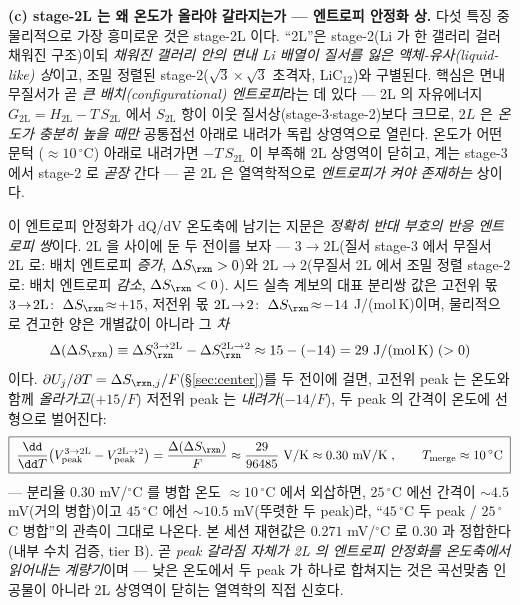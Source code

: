 \textbf{(c) stage-2L 는 왜 온도가 올라야 갈라지는가 --- 엔트로피 안정화 상.} 다섯 특징 중 물리적으로 가장 흥미로운
것은 stage-2L 이다. ``2L''은 stage-2(Li 가 한 갤러리 걸러 채워진 구조)이되 \emph{채워진 갤러리 안의 면내 Li 배열이
질서를 잃은 액체-유사(liquid-like) 상}이고, 조밀 정렬된 stage-2($\sqrt3\!\times\!\sqrt3$ 초격자, $\mathrm{LiC_{12}}$)와
구별된다. 핵심은 면내 무질서가 곧 \emph{큰 배치(configurational) 엔트로피}라는 데 있다 --- 2L 의 자유에너지
$G_{2\mathrm L}=H_{2\mathrm L}-T\,S_{2\mathrm L}$ 에서 $S_{2\mathrm L}$ 항이 이웃 질서상(stage-3$\cdot$stage-2)보다
크므로, $2L$ 은 \emph{온도가 충분히 높을 때만} 공통접선 아래로 내려가 독립 상영역으로 열린다. 온도가 어떤 문턱
($\approx10\,^\circ$C) 아래로 내려가면 $-T\,S_{2\mathrm L}$ 이 부족해 2L 상영역이 닫히고, 계는 stage-3 에서
stage-2 로 \emph{곧장} 간다 --- 곧 2L 은 열역학적으로 \emph{엔트로피가 켜야 존재하는} 상이다.

이 엔트로피 안정화가 dQ/dV 온도축에 남기는 지문은 \emph{정확히 반대 부호의 반응 엔트로피 쌍}이다. 2L 을 사이에 둔
두 전이를 보자 --- $3\!\to\!2\mathrm L$(질서 stage-3 에서 무질서 2L 로: 배치 엔트로피 \emph{증가}, $\Delta S_{\rxn}>0$)와
$2\mathrm L\!\to\!2$(무질서 2L 에서 조밀 정렬 stage-2 로: 배치 엔트로피 \emph{감소}, $\Delta S_{\rxn}<0$). 시드 실측
계보의 대표 분리쌍 값은 고전위 몫 $3\!\to\!2\mathrm L\!:\ \Delta S_{\rxn}\!\approx\!+15$, 저전위 몫
$2\mathrm L\!\to\!2\!:\ \Delta S_{\rxn}\!\approx\!-14$ J/(mol\,K)이며, 물리적으로 견고한 양은 개별값이 아니라 그 \emph{차}
\begin{equation}
\Delta(\Delta S_{\rxn})\equiv\Delta S_{\rxn}^{3\to2\mathrm L}-\Delta S_{\rxn}^{2\mathrm L\to2}
\approx15-(-14)=29\ \mathrm{J/(mol\,K)}\;(>0)
\label{eq:gr-dds}
\end{equation}
이다. $\partial U_j/\partial T=\Delta S_{\rxn,j}/F$(\S\ref{sec:center})를 두 전이에 걸면, 고전위 peak 는 온도와 함께
\emph{올라가고}($+15/F$) 저전위 peak 는 \emph{내려가}($-14/F$), 두 peak 의 간격이 온도에 선형으로 벌어진다:
\begin{equation}
\boxed{\;
\frac{\dd}{\dd T}\big(V_{\mathrm{peak}}^{3\to2\mathrm L}-V_{\mathrm{peak}}^{2\mathrm L\to2}\big)
=\frac{\Delta(\Delta S_{\rxn})}{F}\approx\frac{29}{96485}\ \mathrm{V/K}\approx0.30\ \mathrm{mV/K}\;,\qquad
T_{\mathrm{merge}}\approx10\,^\circ\mathrm C\;}
\label{eq:gr-split}
\end{equation}
--- 분리율 $0.30$ mV/$^\circ$C 를 병합 온도 $\approx10\,^\circ$C 에서 외삽하면, $25\,^\circ$C 에선 간격이
$\sim\!4.5$ mV(거의 병합)이고 $45\,^\circ$C 에선 $\sim\!10.5$ mV(뚜렷한 두 peak)라, ``$45\,^\circ$C 두 peak /
$25\,^\circ$C 병합''의 관측이 그대로 나온다. 본 세션 재현값은 $0.271$ mV/$^\circ$C 로 $0.30$ 과 정합한다(내부 수치
검증, tier B). 곧 \emph{peak 갈라짐 자체가 2L 의 엔트로피 안정화를 온도축에서 읽어내는 계량기}이며 --- 낮은 온도에서
두 peak 가 하나로 합쳐지는 것은 곡선맞춤 인공물이 아니라 2L 상영역이 닫히는 열역학의 직접 신호다.

